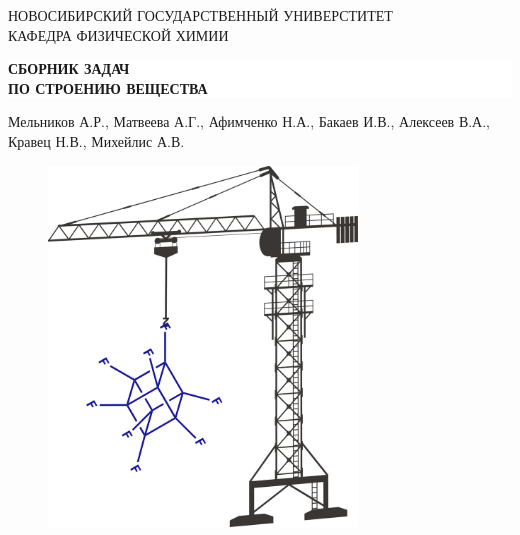 

\begin{titlepage}
    \centering
    \small НОВОСИБИРСКИЙ ГОСУДАРСТВЕННЫЙ УНИВЕРСТИТЕТ\\
    КАФЕДРА ФИЗИЧЕСКОЙ ХИМИИ\\
    \vspace{14px}
    \colorbox{white}{
        \parbox[t]{0.975\textwidth}{%
            \parbox[t]{0.95\textwidth}{%
                \centering\vspace{0.75cm}\huge\scshape
                \textbf{СБОРНИК ЗАДАЧ\\ПО СТРОЕНИЮ ВЕЩЕСТВА} \\[3.5pt]
                \large\bf
            }
        }
    }
    
    \vspace{16px}
    \centering \normalsize Мельников А.Р., Матвеева А.Г., Афимченко Н.А., Бакаев И.В., Алексеев В.А., Кравец Н.В., Михейлис А.В.
    \vspace{18px}
	\begin{figure}[h]
	    \centering
	    \includegraphics[width=0.73\textwidth]{images/title.png}
	\end{figure}


\end{titlepage}

